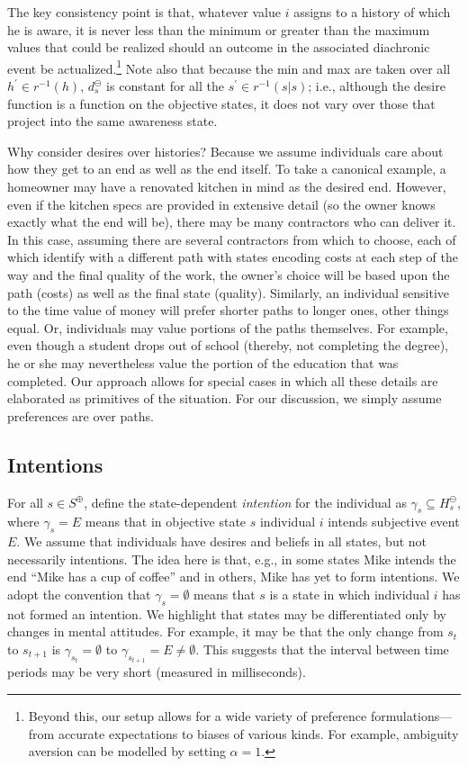 \documentclass[
11pt,
titlepage,
reqno,
]{article}%
\theoremstyle{definition}
\begin{document}
The key consistency point is that, whatever value $i$ assigns to a history of which he is aware, it is never less than the minimum or greater than the maximum values that could be realized should an outcome in the associated diachronic event be actualized.\footnote
{
	Beyond this, our setup allows for a wide variety of preference formulations---from accurate expectations to biases of various kinds. For example, ambiguity aversion can be modelled by setting $\alpha=1$.
} 
Note also that because the min and max are taken over all $h^\prime\in r^{-1}(h)$, $d^\ominus_s$ is constant for all the $s^\prime\in r^{-1}(s|s)$; i.e., although the desire function is a function on the objective states, it does not vary over those that project into the same awareness state.
  

	
Why consider desires over histories? 
Because we assume individuals care about how they get to an end as well as the end itself. 
To take a canonical example, a homeowner may have a renovated kitchen in mind as the desired end. 
However, even if the kitchen specs are provided in extensive detail (so the owner knows exactly what the end will be), there may be many contractors who can deliver it. 
In this case, assuming there are several contractors from which to choose, each of which identify with a different path with states encoding costs  at each step of the way and the final quality of the work, the owner's choice will be based upon the path (costs) as well as the final state (quality). 
Similarly, an individual sensitive to the time value of money will prefer shorter paths to longer ones, other things equal. 
Or, individuals may value portions of the paths themselves.
For example, even though a student drops out of school (thereby, not completing the degree), he or she may nevertheless value the portion of the education that was completed. 
Our approach allows for special cases in which all these details are elaborated as primitives of the situation. For our discussion, we simply assume preferences are over paths.    


	
	
\subsection{Intentions} \label{sec: intentions}
	
For all $s\in S^\oplus$, define the state-dependent \textit{intention} for the individual as $\gamma_s\subseteq H^\ominus_s$, where $\gamma_s=E$ means that in objective state $s$ individual $i$ intends subjective event $E$. 
We assume that individuals have desires and beliefs in all states, but not necessarily intentions. 
The idea here is that, e.g., in some states Mike intends the end ``Mike has a cup of coffee'' and in others, Mike has yet to form intentions.
We adopt the convention that $\gamma_s=\emptyset$ means that $s$ is a state in which individual $i$ has not formed an intention. 
We highlight that states may be differentiated only by changes in mental attitudes. 
For example, it may be that the only change from $s_t$ to $s_{t+1}$ is $\gamma_{s_t}=\emptyset$ to $\gamma_{s_{t+1}}=E\ne\emptyset$.
This suggests that the interval between time periods may be very short (measured in milliseconds).
	
\end{document}
